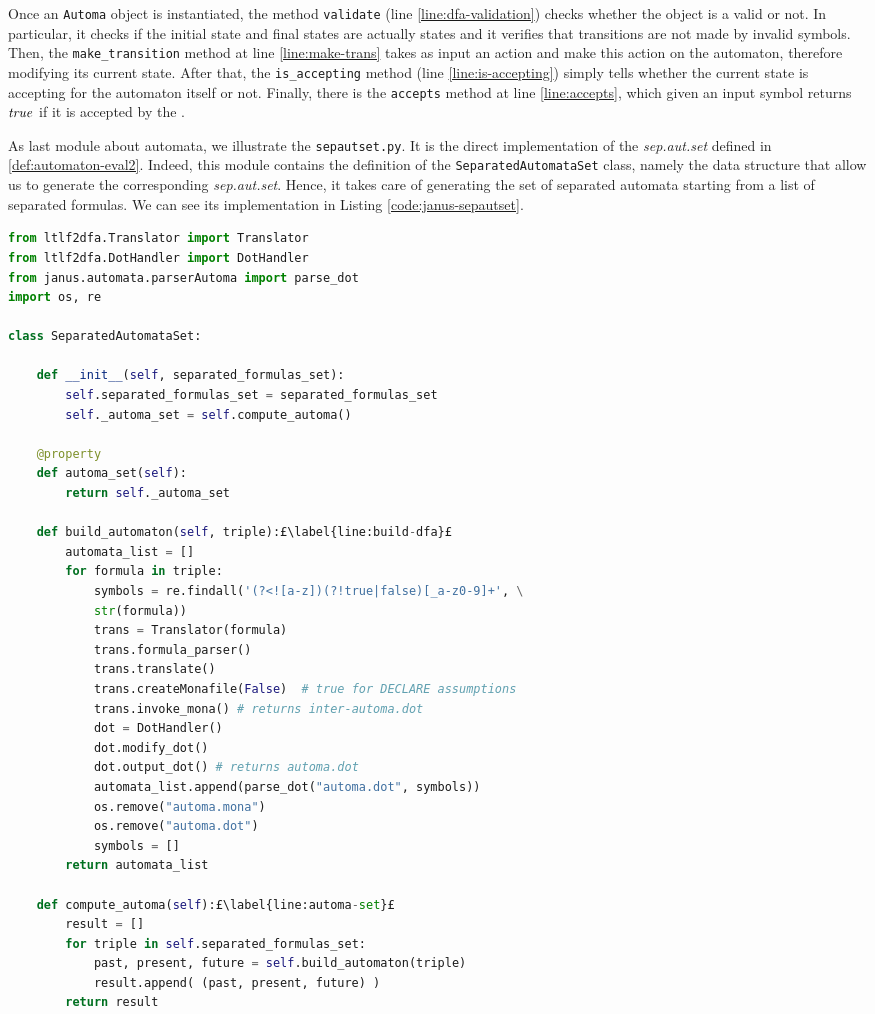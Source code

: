Once an \texttt{Automa} object is instantiated, the method \texttt{validate} (line \ref{line:dfa-validation}) checks whether the object is a valid \DFA or not. In particular, it checks if the initial state and final states are actually states and it verifies that transitions are not made by invalid symbols.
Then, the \texttt{make\_transition} method at line \ref{line:make-trans} takes as input an action and make this action on the automaton, therefore modifying its current state. After that, the \texttt{is\_accepting} method (line \ref{line:is-accepting}) simply tells whether the current state is accepting for the automaton itself or not. Finally, there is the \texttt{accepts} method at line \ref{line:accepts}, which given an input symbol returns $\mathit{true}$ if it is accepted by the \DFA.

As last module about automata, we illustrate the \texttt{sepautset.py}. It is the direct implementation of the \textit{sep.aut.set} defined in \ref{def:automaton-eval2}. Indeed, this module contains the definition of the \texttt{SeparatedAutomataSet} class, namely the data structure that allow us to generate the corresponding \textit{sep.aut.set}. Hence, it takes care of generating the set of separated automata starting from a list of separated formulas. We can see its implementation in Listing \ref{code:janus-sepautset}.
\begin{lstlisting}[language=Python, style=Python, escapechar = £, label={code:janus-sepautset}, caption={The \texttt{sepautset.py} module}]
from ltlf2dfa.Translator import Translator
from ltlf2dfa.DotHandler import DotHandler
from janus.automata.parserAutoma import parse_dot
import os, re

class SeparatedAutomataSet:

    def __init__(self, separated_formulas_set):
        self.separated_formulas_set = separated_formulas_set
        self._automa_set = self.compute_automa()

    @property
    def automa_set(self):
        return self._automa_set

    def build_automaton(self, triple):£\label{line:build-dfa}£
        automata_list = []
        for formula in triple:
            symbols = re.findall('(?<![a-z])(?!true|false)[_a-z0-9]+', \
            str(formula))
            trans = Translator(formula)
            trans.formula_parser()
            trans.translate()
            trans.createMonafile(False)  # true for DECLARE assumptions
            trans.invoke_mona() # returns inter-automa.dot
            dot = DotHandler()
            dot.modify_dot()
            dot.output_dot() # returns automa.dot
            automata_list.append(parse_dot("automa.dot", symbols))
            os.remove("automa.mona")
            os.remove("automa.dot")
            symbols = []
        return automata_list
        
    def compute_automa(self):£\label{line:automa-set}£
        result = []
        for triple in self.separated_formulas_set:
            past, present, future = self.build_automaton(triple)
            result.append( (past, present, future) )
        return result
\end{lstlisting}
